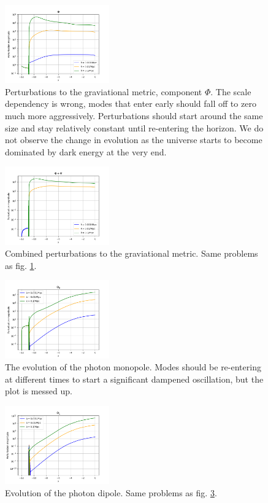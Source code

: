 \begin{figure}[h!tbp]
\centering
\includegraphics[width=0.4\textwidth]{../Milestone 3/Plots/phi_plot.png}
\caption{Perturbations to the graviational metric, component $\Phi$. The scale dependency is wrong, modes that enter early should fall off to zero much more aggressively. Perturbations should start around the same size and stay relatively constant until re-entering the horizon. We do not observe the change in evolution as the universe starts to become dominated by dark energy at the very end.}
\label{fig:milestone_3_phi}
\end{figure}

\begin{figure}[h!tbp]
\centering
\includegraphics[width=0.4\textwidth]{../Milestone 3/Plots/phi_plus_psi_plot.png}
\caption{Combined perturbations to the graviational metric. Same problems as fig. \ref{fig:milestone_3_phi}.}
\label{fig:milestone_3_phi_plus_psi}
\end{figure}

\begin{figure}[h!tbp]
\centering
\includegraphics[width=0.4\textwidth]{../Milestone 3/Plots/theta_0_plot.png}
\caption{The evolution of the photon monopole. Modes should be re-entering at different times to start a significant dampened oscillation, but the plot is messed up.}
\label{fig:milestone_3_theta_0}
\end{figure}

\begin{figure}[h!tbp]
\centering
\includegraphics[width=0.4\textwidth]{../Milestone 3/Plots/theta_1_plot.png}
\caption{Evolution of the photon dipole. Same problems as fig. \ref{fig:milestone_3_theta_0}.}
\label{fig:milestone_3_theta_1}
\end{figure}
